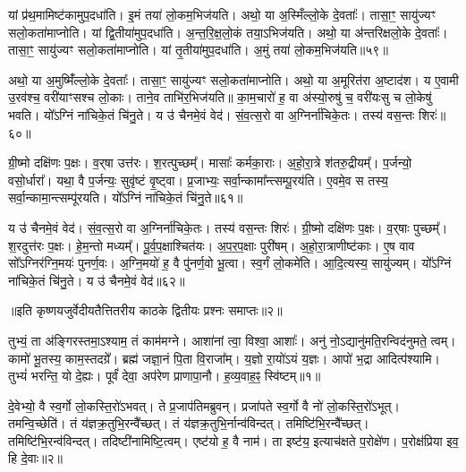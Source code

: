    यां प्र॑थ॒मामिष्ट॑कामुप॒दधा॑ति।
   इ॒मं तया॑ लो॒कम॒भिज॑यति।
   अथो॒ या अ॒स्मिँल्लो॒के दे॒वताः᳚।
   तासा॒ꣳ॒ सायु॑ज्यꣳ सलो॒कता॑माप्नोति।
   यां द्वि॒तीया॑मुप॒दधा॑ति।
   अ॒न्त॒रि॒क्ष॒लो॒कं तया॒ऽभिज॑यति।
   अथो॒ या अ॑न्तरिक्षलो॒के दे॒वताः᳚।
   तासा॒ꣳ॒ सायु॑ज्यꣳ सलो॒कता॑माप्नोति।
   यां तृ॒तीया॑मुप॒दधा॑ति।
   अ॒मुं तया॑ लो॒कम॒भिज॑यति॥५९॥

   अथो॒ या अ॒मुष्मिँ॑ल्लो॒के दे॒वताः᳚।
   तासा॒ꣳ॒ सायु॑ज्यꣳ सलो॒कता॑मा\-प्नोति।
   अथो॒ या अ॒मूरित॑रा अ॒ष्टाद॑श।
   य ए॒वामी उ॒रव॑श्च॒ वरी॑याꣳसश्च लो॒काः।
   ताने॒व ताभि॑र॒भिज॑यति॥
   का॒म॒चारो॑ ह॒ वा अ॑स्यो॒रुषु॑ च॒ वरी॑यःसु च लो॒केषु॑ भवति।
   यो᳚ऽग्निं ना॑चिके॒तं चि॑नु॒ते।
   य उ॑ चैनमे॒वं वेद॑।
   सं॒व॒त्स॒रो वा अ॒ग्निर्ना॑चिके॒तः।
   तस्य॑ वस॒न्तः शिरः॑॥६०॥

   ग्री॒ष्मो दक्षि॑णः प॒क्षः।
   व॒र्{‌}षा उत्त॑रः।
   श॒रत्पुच्छम्᳚।
   मासाः᳚ कर्मका॒राः।
   अ॒हो॒रा॒त्रे श॑तरु॒द्रीयम्᳚।
   प॒र्जन्यो॒ वसो॒र्धारा᳚।
   यथा॒ वै प॒र्जन्यः॒ सुवृ॑ष्टं वृ॒ष्ट्वा।
   प्र॒जाभ्यः॒ सर्वा॒न्कामा᳚न्त्सम्पू॒रय॑ति।
   ए॒वमे॒व स तस्य॒ सर्वा॒न्कामा॒न्त्सम्पू॑रयति।
   यो᳚ऽग्निं ना॑चिके॒तं चि॑नु॒ते॥६१॥

   य उ॑ चैनमे॒वं वेद॑।
   सं॒व॒त्स॒रो वा अ॒ग्निर्ना॑चिके॒तः।
   तस्य॑ वस॒न्तः शिरः॑।
   ग्री॒ष्मो दक्षि॑णः प॒क्षः।
   व॒र्{‌}षाः पुच्छम्᳚।
   श॒रदुत्त॑रः प॒क्षः।
   हे॒म॒न्तो मध्यम्᳚।
   पू॒र्व॒प॒क्षाश्चित॑यः।
   अ॒प॒र॒प॒क्षाः पुरी॑षम्।
   अ॒हो॒रा॒त्राणीष्ट॑काः।
   ए॒ष वाव सो᳚ऽग्निर॑ग्नि॒मयः॑ पुनर्ण॒वः।
   अ॒ग्नि॒मयो॑ ह॒ वै पु॑नर्ण॒वो भू॒त्वा।
   स्व॒र्गं लो॒कमे॑ति।
   आ॒दि॒त्यस्य॒ सायु॑ज्यम्।
   यो᳚ऽग्निं ना॑चिके॒तं चि॑नु॒ते।
   य उ॑ चैनमे॒वं वेद॑॥६२॥
\anuvakamend

  ॥इति कृष्णयजुर्वेदीयतैत्तितरीय काठके द्वितीयः प्रश्नः समाप्तः॥२॥


\setcounter{anuvakam}{0}

   तुभ्यं॒ ता अ॑ङ्गिरस्तमा॒ऽश्याम॒ तं काम॑मग्ने।
   आशा॑नां त्वा॒ विश्वा॒ आशाः᳚।
   अनु॑ नो॒ऽद्यानु॑मति॒रन्विद॑नुमते॒ त्वम्।
   कामो॑ भू॒तस्य॒ काम॒स्तदग्रे᳚।
   ब्रह्म॑ जज्ञा॒नं पि॒ता वि॒राजा᳚म्।
   य॒ज्ञो रा॒यो॑ऽयं य॒ज्ञः।
   आपो॑ भ॒द्रा आदित्प॑श्यामि।
   तुभ्यं॑ भरन्ति॒ यो दे॒ह्यः।
   पूर्वं॑ देवा॒ अप॑रेण प्राणापा॒नौ।
   ह॒व्य॒वाह॒ꣴ॒ स्वि॑ष्टम्॥१॥\anuvakamend
  

   दे॒वेभ्यो॒ वै स्व॒र्गो लो॒कस्ति॒रो॑ऽभवत्।
   ते प्र॒जाप॑तिमब्रुवन्।
   प्रजा॑पते स्व॒र्गो वै नो॑ लो॒कस्ति॒रो॑ऽभूत्।
   तमन्वि॒च्छेति॑।
   तं य॑ज्ञक्र॒तुभि॒रन्वै᳚च्छत्।
   तं य॑ज्ञक्र॒तुभि॒र्नान्व॑विन्दत्।
   तमिष्टि॑भि॒रन्वै᳚च्छत्।
   तमिष्टि॑भि॒रन्व॑विन्दत्।
   तदिष्टी॑नामिष्टि॒\-त्वम्।
   एष्ट॑यो ह॒ वै नाम॑।
   ता इष्ट॑य॒ इत्याच॑क्षते प॒रोक्षे॑ण।
   प॒रोक्ष॑प्रिया इव॒ हि दे॒वाः॥२॥

